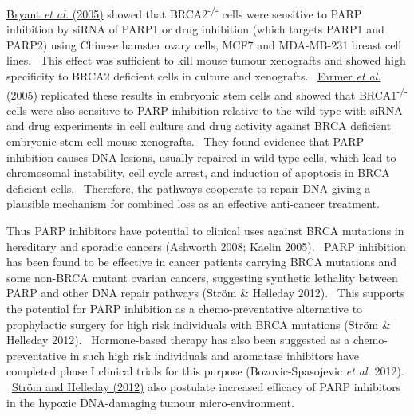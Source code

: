 \hyperlink{ENREF19}{Bryant}\hyperlink{ENREF19}{\textit{ et al.}}\hyperlink{ENREF19}{ (2005)} showed that BRCA2\textsuperscript{{}-/-} cells were sensitive to PARP inhibition by siRNA of PARP1 or drug inhibition (which targets PARP1 and PARP2) using Chinese hamster ovary cells, MCF7 and MDA-MB-231 breast cell lines. \ This effect was sufficient to kill mouse tumour xenografts and showed high specificity to BRCA2 deficient cells in culture and xenografts. \ \hyperlink{ENREF39}{Farmer}\hyperlink{ENREF39}{\textit{ et al.}}\hyperlink{ENREF39}{ (2005)} replicated these results in embryonic stem cells and showed that BRCA1\textsuperscript{{}-/-} cells were also sensitive to PARP inhibition relative to the wild-type with siRNA and drug experiments in cell culture and drug activity against BRCA deficient embryonic stem cell mouse xenografts. \ They found evidence that PARP inhibition causes DNA lesions, usually repaired in wild-type cells, which lead to chromosomal instability, cell cycle arrest, and induction of apoptosis in BRCA deficient cells. \ Therefore, the pathways cooperate to repair DNA giving a plausible mechanism for combined loss as an effective anti-cancer treatment. \  

Thus PARP inhibitors have potential to clinical uses against BRCA mutations in hereditary and sporadic cancers (Ashworth 2008; Kaelin 2005). \ PARP inhibition has been found to be effective in cancer patients carrying BRCA mutations and some non-BRCA mutant ovarian cancers, suggesting synthetic lethality between PARP and other DNA repair pathways (Str\"om \& Helleday 2012). \ This supports the potential for PARP inhibition as a chemo-preventative alternative to prophylactic surgery for high risk individuals with BRCA mutations (Str\"om \& Helleday 2012). \ Hormone-based therapy has also been suggested as a chemo-preventative in such high risk individuals and aromatase inhibitors have completed phase I clinical trials for this purpose (Bozovic-Spasojevic\textit{ et al.} 2012). \ \hyperlink{ENREF91}{Str\"om and Helleday (2012)} also postulate increased efficacy of PARP inhibitors in the hypoxic DNA-damaging tumour micro-environment. \  

